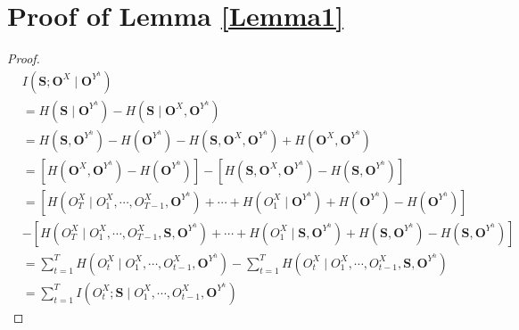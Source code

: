 \documentclass[12pt]{article}
\begin{document}
\section{Proof of Lemma \ref{Lemma1}}
\label{app:Lemma1}
\begin{proof}
\begin{equation}
\begin{aligned}
& I(\mathbf{S}; \mathbf{O}^{X} \mid \mathbf{O}^{Y^{h}}) \\
& = H(\mathbf{S} \mid \mathbf{O}^{Y^{h}}) - H(\mathbf{S} \mid \mathbf{O}^{X} , \mathbf{O}^{Y^{h}}) \\
& = H(\mathbf{S} , \mathbf{O}^{Y^{h}}) - H(\mathbf{O}^{Y^{h}}) - H(\mathbf{S} , \mathbf{O}^{X} , \mathbf{O}^{Y^{h}}) 
+ H(\mathbf{O}^{X} , \mathbf{O}^{Y^{h}}) \\
& = [ H(\mathbf{O}^{X} , \mathbf{O}^{Y^{h}}) - H(\mathbf{O}^{Y^{h}}) ] - [ H(\mathbf{S} , \mathbf{O}^{X} , \mathbf{O}^{Y^{h}}) - H(\mathbf{S} , \mathbf{O}^{Y^{h}}) ] \\
& = [H(O_{T}^{X} \mid O_{1}^{X} , \cdots , O_{T-1}^{X}, \mathbf{O}^{Y^{h}}) + \cdots + H(O_{1}^{X} \mid \mathbf{O}^{Y^{h}}) + H(\mathbf{O}^{Y^{h}}) - H(\mathbf{O}^{Y^{h}}) ] \\
& - [H(O_{T}^{X} \mid O_{1}^{X} , \cdots , O_{T-1}^{X}, \mathbf{S}, \mathbf{O}^{Y^{h}}) + \cdots + H(O_{1}^{X} \mid \mathbf{S}, \mathbf{O}^{Y^{h}}) + H(\mathbf{S} , \mathbf{O}^{Y^{h}}) - H(\mathbf{S} , \mathbf{O}^{Y^{h}})] \\
& = \sum_{t=1}^{T} H(O_{t}^{X} \mid O_{1}^{X} , \cdots , O_{t-1}^{X}, \mathbf{O}^{Y^{h}}) - \sum_{t=1}^{T} H(O_{t}^{X} \mid O_{1}^{X} , \cdots , O_{t-1}^{X}, \mathbf{S}, \mathbf{O}^{Y^{h}}) \\
& = \sum_{t=1}^{T} I(O^{X}_{t} ; \mathbf{S} \mid O^{X}_{1} , \cdots , O^{X}_{t-1}, \mathbf{O}^{Y^{h}})
\end{aligned}
\end{equation}
\end{proof}
\end{document}
